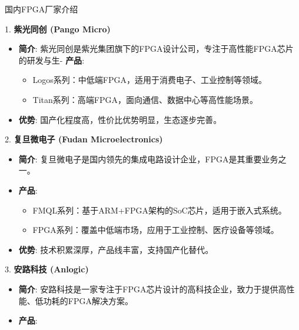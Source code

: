 \documentclass{beamer}
\providecommand{\tightlist}{%
  \setlength{\itemsep}{0pt}\setlength{\parskip}{0pt}}
\begin{document}
\begin{frame}[allowframebreaks]{国内FPGA厂家介绍}
\begin{block}{1. \textbf{紫光同创 (Pango Micro)}}
\begin{itemize}
\tightlist
\item
    \textbf{简介}:
    紫光同创是紫光集团旗下的FPGA设计公司，专注于高性能FPGA芯片的研发与生-
    \textbf{产品}:

    \begin{itemize}
    \tightlist
    \item
    Logos系列：中低端FPGA，适用于消费电子、工业控制等领域。\\
    \item
    Titan系列：高端FPGA，面向通信、数据中心等高性能场景。\\
    \end{itemize}
\item
    \textbf{优势}: 国产化程度高，性价比优势明显，生态逐步完善。
\end{itemize}
\end{block}
\pagebreak
\begin{block}{2. \textbf{复旦微电子 (Fudan Microelectronics)}}
\begin{itemize}
\tightlist
\item
    \textbf{简介}:
    复旦微电子是国内领先的集成电路设计企业，FPGA是其重要业务之一。
\item
    \textbf{产品}:

    \begin{itemize}
    \tightlist
    \item
    FMQL系列：基于ARM+FPGA架构的SoC芯片，适用于嵌入式系统。\\
    \item
    FPGA系列：覆盖中低端市场，应用于工业控制、医疗设备等领域。\\
    \end{itemize}
\item
    \textbf{优势}: 技术积累深厚，产品线丰富，支持国产化替代。
\end{itemize}
\end{block}
\pagebreak
\begin{block}{3. \textbf{安路科技 (Anlogic)}}
\begin{itemize}
\tightlist
\item
    \textbf{简介}:
    安路科技是一家专注于FPGA芯片设计的高科技企业，致力于提供高性能、低功耗的FPGA解决方案。
\item
    \textbf{产品}:


\end{itemize}
\end{block}
\end{frame}
\end{document}
